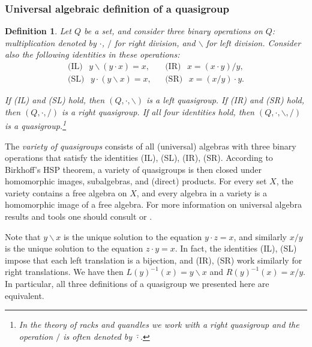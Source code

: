 \documentclass[11pt]{amsart}
\newtheorem{definition}[theorem]{Definition}
\theoremstyle{definition}
\begin{document}
\subsubsection{Universal algebraic definition of a quasigroup}
\begin{definition}\label{Def:Qugp}
Let $Q$ be a set, and consider three binary operations on $Q$: \textit{multiplication} denoted by $\cdot$, $/$ for \textit{right division}, and $\backslash$ for \textit{left division}.  Consider also the following identities in these operations:
\begin{align*}
\text{(IL)}\phantom{A} y\backslash(y\cdot x)=x, && \text{(IR)}\phantom{A}x= (x\cdot y)/ y,\\
\text{(SL)}\phantom{A} y\cdot(y\backslash x)=x, && \text{(SR)}\phantom{A}x= (x/ y)\cdot y.
\end{align*}

\noindent If (IL) and (SL) hold, then $(Q, \cdot, \backslash)$ is a \emph{left quasigroup}.  If (IR) and (SR) hold, then $(Q, \cdot, /)$ is a \emph{right quasigroup}.  If all four identities hold, then $(Q, \cdot, \backslash, /)$ is a \emph{quasigroup}.\footnote{In the theory of racks and quandles we work with a right quasigroup and the operation $/$ is often denoted by $\bar \cdot$. %
}
\end{definition}
The \emph{variety of quasigroups} consists of all (universal) algebras with three binary operations that satisfy the identities (IL), (SL), (IR), (SR). According to Birkhoff's HSP theorem, a variety of quasigroups is then closed under homomorphic images, subalgebras, and (direct) products. %
For every set $X$, the variety contains a free algebra on $X$, and every algebra in a variety is a homomorphic image of a free algebra. For more information on universal algebra results and tools one should consult \cite{Berg} or \cite{Ber}.

Note that $y\backslash x$ is the unique solution to the equation $y\cdot z=x$, and similarly $x/y$ is the unique solution to the equation $z\cdot y=x$. In fact, the identities (IL), (SL) impose that each left translation is a bijection, and (IR), (SR) work similarly for right translations. We have then $L(y)^{-1}(x)=y\backslash x$ and $R(y)^{-1}(x)=x/y$. In particular, all three definitions of a quasigroup we presented here are equivalent. 
\end{document}
